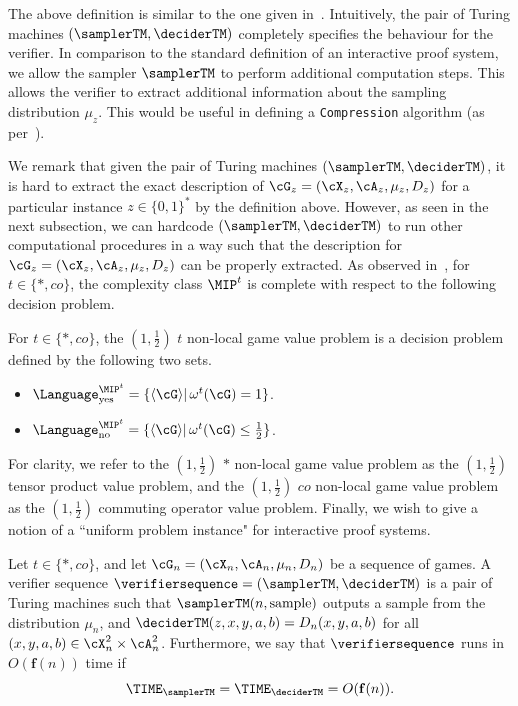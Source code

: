 The above definition is similar to the one given in~\cite[Definition 5.29]{jiMIPRE2022a}. Intuitively, the pair of Turing machines $(\samplerTM, \deciderTM)$ completely specifies the behaviour for the verifier. In comparison to the standard definition of an interactive proof system, we allow the sampler $\samplerTM$ to perform additional computation steps. This allows the verifier to extract additional information about the sampling distribution $\mu_z$. This would be useful in defining a \texttt{Compression} algorithm (as per~). 

We remark that given the pair of Turing machines $(\samplerTM, \deciderTM)$, it is hard to extract the exact description of $\cG_{z} = (\cX_z, \cA_z, \mu_z, D_z)$ for a particular instance $z \in \{0,1\}^*$ by the definition above. However, as seen in the next subsection, we can hardcode $(\samplerTM, \deciderTM)$ to run other computational procedures in a way such that the description for $\cG_{z} = (\cX_z, \cA_z, \mu_z, D_z)$ can be properly extracted.  As observed in~\cite{cleveConsequencesLimitsNonlocal2004}, for $t \in \{*, co\}$, the complexity class $\MIP^{t}$ is complete with respect to the following decision problem. 
\begin{definition}  \label{def:entangledgameproblem}
	For $t \in  \{*, co\}$, the $(1,\frac{1}{2})$ $t$ non-local game value problem is a decision problem defined by the following two sets. 
	\begin{itemize}
		\item $\Language^{\MIP^t}_{\text{yes}} = \{\langle \cG\rangle | \, \omega^t(\cG) = 1\} $. 
		\item $\Language^{\MIP^t}_{\text{no}} = \{\langle \cG \rangle |\,  \omega^t(\cG) \leq \frac{1}{2}\} $. 
	\end{itemize}
\end{definition}
For clarity, we refer to the $(1,\frac{1}{2})$ $*$ non-local game value problem as the $(1,\frac{1}{2})$ tensor product value problem, and the $(1,\frac{1}{2})$ $co$ non-local game value problem as the $(1,\frac{1}{2})$ commuting operator value problem. Finally, we wish to give a notion of a ``uniform problem instance" for interactive proof systems. 

\begin{definition} \label{def:genseq}
	Let $t \in \{*, co\}$, and let $\cG_{n} = (\cX_n, \cA_n, \mu_n, D_n)$ be a sequence of games. A verifier sequence $\verifiersequence = (\samplerTM, \deciderTM)$ is a pair of Turing machines such that $\samplerTM(n, \text{sample})$ outputs a sample from the distribution $\mu_n$, and $\deciderTM(z, x, y, a, b) = D_n(x,y,a,b)$ for all $(x,y,a,b) \in \cX_n^2 \times \cA_n^2$.  Furthermore, we say that $\verifiersequence$ runs in $O(\mathbf{f}(n))$ time if
	\begin{equation*}
		\TIME_{\samplerTM} = \TIME_{\deciderTM} = O(\mathbf{f}(n)). 
	\end{equation*} 
\end{definition}

